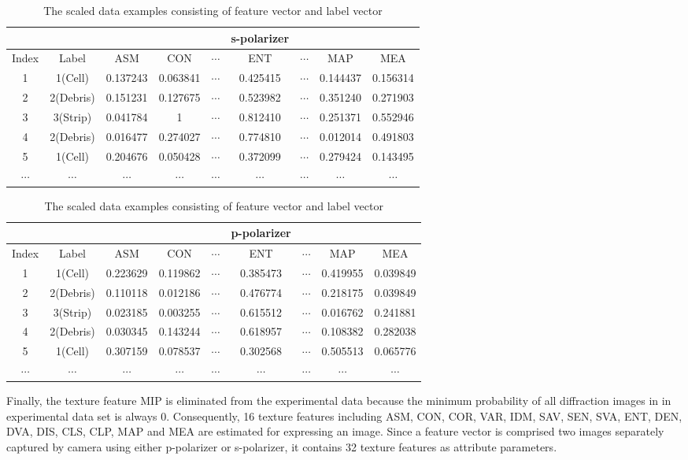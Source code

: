 \begin{table}[!h]
\renewcommand{\arraystretch}{0.5}
\begin{tabular}{||c c | c c c c c c c||}
\hline
& & & & & s-polarizer & & &\\
\hline
Index & Label & ASM & CON & $\cdots$ & ENT & $\cdots$ & MAP & MEA\\[0.7ex]
\hline\hline
1 & 1(Cell) & 0.137243 & 0.063841 & $\cdots$ & 0.425415 & $\cdots$ & 0.144437 & 0.156314 \\
2 & 2(Debris) & 0.151231 & 0.127675 & $\cdots$ & 0.523982 & $\cdots$ & 0.351240 & 0.271903 \\
3 & 3(Strip) & 0.041784 & 1 & $\cdots$ & 0.812410 & $\cdots$ & 0.251371 & 0.552946 \\
4 & 2(Debris) & 0.016477 & 0.274027 & $\cdots$ & 0.774810 & $\cdots$ & 0.012014 & 0.491803 \\
5 & 1(Cell) & 0.204676 & 0.050428 & $\cdots$ & 0.372099 & $\cdots$ & 0.279424 & 0.143495 \\
$\cdots$ & $\cdots$ & $\cdots$ & $\cdots$ & $\cdots$ & $\cdots$ & $\cdots$ & $\cdots$ & $\cdots$\\
\hline
\end{tabular}
\begin{tabular}{||c c | c c c c c c c||}
\hline
& & & & & p-polarizer & & &\\
\hline
Index & Label & ASM & CON & $\cdots$ & ENT & $\cdots$ & MAP & MEA\\[0.7ex]
\hline\hline
1 & 1(Cell) & 0.223629 & 0.119862 & $\cdots$ & 0.385473 & $\cdots$ & 0.419955 & 0.039849 \\
2 & 2(Debris) & 0.110118 & 0.012186 & $\cdots$ & 0.476774 & $\cdots$ & 0.218175 & 0.039849 \\
3 & 3(Strip) & 0.023185 & 0.003255 & $\cdots$ & 0.615512 & $\cdots$ & 0.016762 & 0.241881 \\
4 & 2(Debris) & 0.030345 & 0.143244 & $\cdots$ & 0.618957 & $\cdots$ & 0.108382 & 0.282038 \\
5 & 1(Cell) & 0.307159 & 0.078537 & $\cdots$ & 0.302568 & $\cdots$ & 0.505513 & 0.065776 \\
$\cdots$ & $\cdots$ & $\cdots$ & $\cdots$ & $\cdots$ & $\cdots$ & $\cdots$ & $\cdots$ & $\cdots$\\
\hline
\end{tabular}
\caption {The scaled data examples consisting of feature vector and label vector}
\end{table}
Finally, the texture feature MIP is eliminated from the experimental data because the minimum probability of all diffraction images in in experimental data set is always 0. Consequently, 16 texture features including ASM, CON, COR, VAR, IDM, SAV, SEN, SVA, ENT, DEN, DVA, DIS, CLS, CLP, MAP and MEA are estimated for expressing an image. Since a feature vector is comprised two images separately captured by camera using either p-polarizer or s-polarizer, it contains 32 texture features as attribute parameters.    
